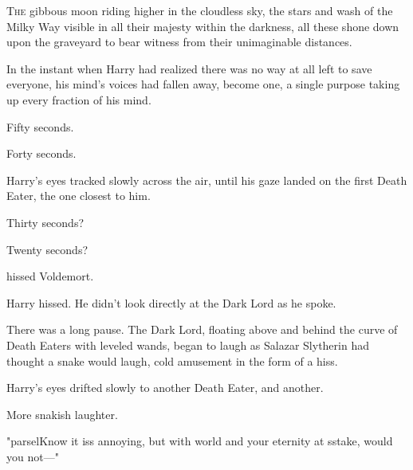 
\lettrine{T}{he} gibbous moon
riding higher in the cloudless sky, the stars and wash of the Milky Way visible
in all their majesty within the darkness, all these shone down upon the
graveyard to bear witness from their unimaginable distances.

In the instant when Harry had realized there was no way at all left to save
everyone, his mind's voices had fallen away, become one, a single purpose
taking up every fraction of his mind.

Fifty seconds.

Forty seconds.

Harry's eyes tracked slowly across the air, until his gaze landed on the first
Death Eater, the one closest to him.

Thirty seconds?

Twenty seconds?

 hissed Voldemort.

 Harry hissed. He didn't
look directly at the Dark Lord as he spoke. 

There was a long pause. The Dark Lord, floating above and behind the curve of
Death Eaters with leveled wands, began to laugh as Salazar Slytherin had
thought a snake would laugh, cold amusement in the form of a hiss. 


Harry's eyes drifted slowly to another Death Eater, and another.

More snakish laughter. 

"parsel{Know it iss annoying, but with world and your eternity at sstake, would
you not}\mbox{---}"

